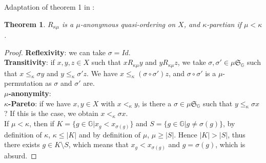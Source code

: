 \documentclass{article}
\newcommand{\G}{\mathbb{G}}
\newtheorem{theorem}{Theorem}
\begin{document}
Adaptation of theorem 1 in \cite{svensson80}:
\begin{theorem}
    $R_{\kappa\mu}$ is a $\mu$-anonymous quasi-ordering on $X$, and $\kappa$-paretian if
    $\mu < \kappa$. %
\end{theorem}
\begin{proof}
    \textbf{Reflexivity}: we can take $\sigma = Id$.\\
    \textbf{Transitivity}: if $x,y,z\in X$ such that $x R_{\kappa\mu} y$ and $y R_{\kappa\mu} z$,
    we take $\sigma,\sigma'\in \mu\mathfrak{S}_\G$ such that $x\leq_\kappa \sigma y$ and
    $y\leq_\kappa \sigma' z$. We have $x\leq_\kappa (\sigma\circ\sigma')z$,
    and $\sigma\circ\sigma'$ is a $\mu$-permutation as $\sigma$ and $\sigma'$ are.\\
    \textbf{$\mu$-anonymity}: \\
    \textbf{$\kappa$-Pareto}: if we have $x,y\in X$ with $x<_\kappa y$, is there a
    $\sigma\in \mu\mathfrak{S}_\G$ such that $y\leq_\kappa \sigma x$? If this is the case,
    we obtain $x<_\kappa \sigma x$.\\
    If $\mu < \kappa$, then if $K=\{g\in\G|x_g<x_{\sigma(g)}\}$ and
    $S = \{g\in\G|g \neq\sigma(g)\}$,
    by definition of $\kappa$, $\kappa\leq|K|$ and by definition of $\mu$, $\mu\geq |S|$.
    Hence $|K|>|S|$, thus there exists $g\in K\setminus S$, which means that
    $x_g<x_{\sigma(g)}$ and $g=\sigma(g)$, which is absurd.
\end{proof}



\end{document}
